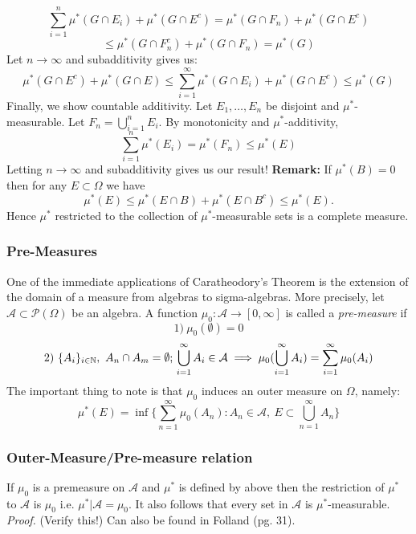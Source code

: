 \documentclass{article}
\begin{document}
\[
\sum_{i=1}^n \mu^*(G \cap E_i)+\mu^*(G\cap E^c) = \mu^*(G\cap F_n) + \mu^*(G\cap E^c)
\]
\[
\leq \mu^*(G\cap F_n^c) +\mu^*(G\cap F_n) = \mu^*(G)
\]
Let $n\to \infty$ and subadditivity gives us:
\[
\mu^*(G\cap E^c) +\mu^*(G\cap E) \leq \sum_{i=1}^{\infty} \mu^*(G \cap E_i)+\mu^*(G\cap E^c) \leq \mu^*(G)
\]
Finally, we show countable additivity. Let $E_1, \ldots, E_n$ be disjoint and  $\mu^*$-measurable. Let $F_n = \bigcup_{i=1}^nE_i$. By monotonicity and $\mu^*$-additivity, 
\[
\sum_{i=1}^n\mu^*(E_i) =\mu^*(F_n) \leq \mu^*(E)
\]
Letting $ n \to \infty$ and subadditivity gives us our result! \newline \newline
\textbf{Remark:} \newline \newline
If $\mu^*(B) = 0$ then for any $E \subset \Omega$ we have 
\[
\mu^*(E) \leq \mu^*(E\cap B) + \mu^*(E\cap B^c) \leq \mu^*(E).
\]
Hence $\mu^*$ restricted to the collection of $\mu^*$-measurable sets is a complete measure.

\subsubsection{Pre-Measures}
One of the immediate applications of Caratheodory's Theorem is the extension of the domain of a measure from algebras to sigma-algebras. More precisely, let $\mathcal{A} \subset\mathcal{P}(\Omega)$ be an algebra. A function $\mu_0:\mathcal{A} \to [0, \infty]$ is called a \textit{pre-measure} if 
\[
1) \ \mu_0(\emptyset) = 0
\]
\[
2) \ \{A_i\}_{i \in \mathbb{N}}, \ A_n \cap A_m = \emptyset ; \\\bigcup_{i=1}^{\infty}A_i \in \mathcal{A} \implies \mu_0(\bigcup_{i=1}^{\infty}A_i)=\sum_{i=1}^{\infty}\mu_0(A_i)
\]
The important thing to note is that $\mu_0$ induces an outer measure on $\Omega$, namely: 
\[
\mu^*(E)=\inf \{\sum_{n=1}^{\infty}\mu_0(A_n): A_n \in \mathcal{A}, \ E\subset \bigcup_{n=1}^{\infty}A_n\}
\]

\subsubsection{Outer-Measure/Pre-measure relation}
If $\mu_0$ is a premeasure on $\mathcal{A}$ and $\mu^*$ is defined by above then the restriction of $\mu^*$ to $\mathcal{A}$ is $\mu_0$ i.e. $\mu^*|\mathcal{A}=\mu_0$. It also follows that every set in $\mathcal{A}$ is $\mu^*$-measurable. \newline \newline
\textit{Proof.}\newline \newline
(Verify this!)\newline \newline
Can also be found in Folland (pg. 31).
\end{document}
